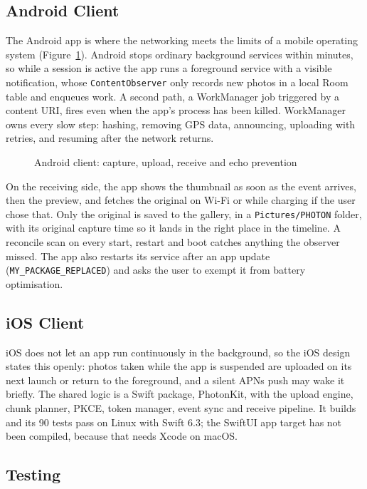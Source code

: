\subsection{Android Client}

The Android app is where the networking meets the limits of a mobile operating system (Figure~\ref{fig:android}). Android stops ordinary background services within minutes, so while a session is active the app runs a foreground service with a visible notification, whose \texttt{ContentObserver} only records new photos in a local Room table and enqueues work. A second path, a WorkManager job triggered by a content URI, fires even when the app's process has been killed. WorkManager owns every slow step: hashing, removing GPS data, announcing, uploading with retries, and resuming after the network returns.

\begin{figure}[H]
\centering
{}
\caption{Android client: capture, upload, receive and echo prevention}\label{fig:android}
\end{figure}

On the receiving side, the app shows the thumbnail as soon as the event arrives, then the preview, and fetches the original on Wi-Fi or while charging if the user chose that. Only the original is saved to the gallery, in a \texttt{Pictures/PHOTON} folder, with its original capture time so it lands in the right place in the timeline. A reconcile scan on every start, restart and boot catches anything the observer missed. The app also restarts its service after an app update (\texttt{MY\_PACKAGE\_REPLACED}) and asks the user to exempt it from battery optimisation.

\subsection{iOS Client}

iOS does not let an app run continuously in the background, so the iOS design states this openly: photos taken while the app is suspended are uploaded on its next launch or return to the foreground, and a silent APNs push may wake it briefly. The shared logic is a Swift package, PhotonKit, with the upload engine, chunk planner, PKCE, token manager, event sync and receive pipeline. It builds and its 90 tests pass on Linux with Swift 6.3; the SwiftUI app target has not been compiled, because that needs Xcode on macOS.

\subsection{Testing}

